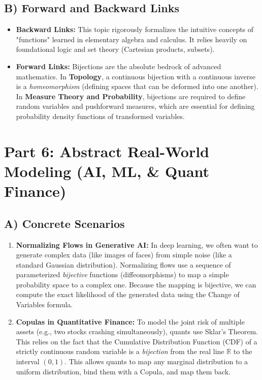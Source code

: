 \documentclass[11pt, a4paper]{article}
\theoremstyle{definition}
\theoremstyle{remark}
\newcommand{\R}{\mathbb{R}}
\begin{document}
\subsection{B) Forward and Backward Links}
\begin{itemize}
    \item \textbf{Backward Links:} This topic rigorously formalizes the intuitive concepts of "functions" learned in elementary algebra and calculus. It relies heavily on foundational logic and set theory (Cartesian products, subsets).
    \item \textbf{Forward Links:} Bijections are the absolute bedrock of advanced mathematics. In \textbf{Topology}, a continuous bijection with a continuous inverse is a \textit{homeomorphism} (defining spaces that can be deformed into one another). In \textbf{Measure Theory and Probability}, bijections are required to define random variables and pushforward measures, which are essential for defining probability density functions of transformed variables.
\end{itemize}

\section{Part 6: Abstract Real-World Modeling (AI, ML, \& Quant Finance)}

\subsection{A) Concrete Scenarios}
\begin{enumerate}
    \item \textbf{Normalizing Flows in Generative AI:} In deep learning, we often want to generate complex data (like images of faces) from simple noise (like a standard Gaussian distribution). Normalizing flows use a sequence of parameterized \textit{bijective} functions (diffeomorphisms) to map a simple probability space to a complex one. Because the mapping is bijective, we can compute the exact likelihood of the generated data using the Change of Variables formula.
    \item \textbf{Copulas in Quantitative Finance:} To model the joint risk of multiple assets (e.g., two stocks crashing simultaneously), quants use Sklar's Theorem. This relies on the fact that the Cumulative Distribution Function (CDF) of a strictly continuous random variable is a \textit{bijection} from the real line $\R$ to the interval $(0,1)$. This allows quants to map any marginal distribution to a uniform distribution, bind them with a Copula, and map them back.
\end{enumerate}
\end{document}
